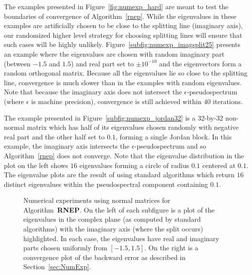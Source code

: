 \documentclass{article}
\theoremstyle{definition}
\begin{document}
The examples presented in Figure~\ref{fig:numexp_hard} are meant to test the boundaries of convergence of Algorithm~\ref{rnep}.  While the eigenvalues in these examples are artificially chosen to be close to the splitting line (imaginary axis), our randomized higher level strategy for choosing splitting lines will ensure that such cases will be highly unlikely.  Figure~\ref{subfig:numexp_imagsplit25} presents an example where the eigenvalues are chosen with random imaginary part (between $-1.5$ and $1.5$) and real part set to $\pm 10^{-10}$ and the eigenvectors form a random orthogonal matrix. Because all the eigenvalues lie so close to the splitting line, convergence is much slower than in the examples with random eigenvalues.  Note that because the imaginary axis does not intersect the $\epsilon$-pseudospectrum (where $\epsilon$ is machine precision), convergence is still achieved within $40$ iterations.

The example presented in Figure~\ref{subfig:numexp_jordan32} is a 32-by-32 non-normal matrix which has half of its eigenvalues chosen randomly with negative real part and the other half set to $0.1$, forming a single Jordan block.  In this example, the imaginary axis intersects the $\epsilon$-pseudospectrum and so Algorithm~\ref{rnep} does not converge. Note that the eigenvalue distribution in the plot on the left shows $16$ eigenvalues forming a circle of radius $0.1$ centered at $0.1$.  The eigenvalue plots are the result of using standard algorithms which return $16$ distinct eigenvalues within the pseudospectral component containing $0.1$.

\begin{figure}
\centering
{}
\caption{Numerical experiments using normal matrices for Algorithm~\textbf{RNEP}.  On the left of each subfigure
is a plot of the eigenvalues in the complex plane (as computed by standard algorithms)
with the imaginary axis (where the split occurs) highlighted.  In each case, the
eigenvalues have real and imaginary parts chosen uniformly from $[-1.5,1.5]$.  On the
right is a convergence plot of the backward error as described in
Section~\ref{sec:NumExp}.}
\label{fig:numexp_rand}
\end{figure}
\end{document}
